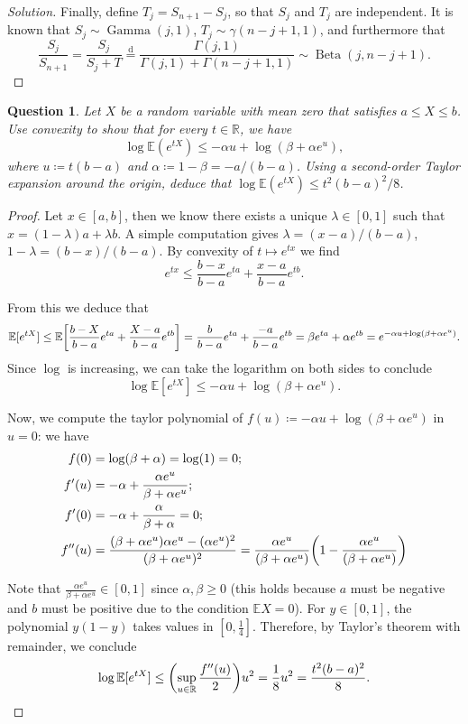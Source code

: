 \documentclass{article}
\theoremstyle{plain}
\newtheorem{question}{Question}
\theoremstyle{remark}
\newenvironment{solution}{\begin{proof}[Solution]\renewcommand\qedsymbol{}}{\end{proof}}
\newcommand{\Bb}{\mathbb}
\newcommand{\Rm}{\mathrm}
\newcommand{\RR}{\Bb R}
\newcommand{\EE}{\Bb E}
\newcommand\ceq\coloneqq %
\newcommand\deq{\overset{\Rm{d}}=}
\DeclareMathOperator\Beta{Beta}
\DeclareMathOperator\Gam{Gamma}
\begin{document}
\begin{solution}
Finally, define $T_j = S_{n+1} - S_j$, so that $S_j$ and $T_j$ are independent. It is known that $S_j \sim \Gam(j, 1)$, $T_j \sim \gamma(n - j + 1, 1)$, and furthermore that
\[
\frac{S_j}{S_{n+1}} = \frac{S_j}{S_j + T} \deq \frac{\Gamma(j, 1)}{\Gamma(j, 1) + \Gamma(n - j + 1, 1)} \sim \Beta(j, n - j + 1). 
\]
\end{solution}

\begin{question}
    Let $X$ be a random variable with mean zero that satisfies $a \leq X \leq b$. Use convexity to show that for every $t \in \RR$, we have
    \[
    \log \EE(e^{tX}) \leq - \alpha u + \log(\beta + \alpha e^u),
    \]
    where $u \ceq t(b-a)$ and $\alpha \ceq 1 - \beta = -a/(b-a)$. Using a second-order Taylor expansion around the origin, deduce that $\log \EE(e^{tX}) \leq t^2 (b-a)^2/8$. 
\end{question}

\begin{proof}
    Let $x \in [a, b]$, then we know there exists a unique $\lambda \in [0, 1]$ such that $x = (1-\lambda) a + \lambda b$. A simple computation gives $\lambda = (x-a)/(b-a)$, $1 - \lambda = (b-x)/(b-a)$. By convexity of $t \mapsto e^{tx}$ we find
    \[
    e^{tx} \leq \frac{b-x}{b-a} e^{t a} + \frac{x-a}{b-a} e^{t b}. 
    \]
    
    From this we deduce that 
    \[
    \EE[e^{tX}] \leq \EE\qty[\frac{b-X}{b-a} e^{t a} + \frac{X-a}{b-a} e^{t b}] = \frac{b}{b - a} e ^{ta} + \frac{-a}{b - a} e^{tb} = \beta e^{ta} + \alpha e^{tb} = e^{-\alpha u + \log(\beta + \alpha e^u)}. 
    \]
    Since $\log$ is increasing, we can take the logarithm on both sides to conclude
    \[
    \log \EE[e^{tX}] \leq -\alpha u + \log(\beta + \alpha e^u). 
    \]
    
    Now, we compute the taylor polynomial of $f(u) \ceq -\alpha u + \log(\beta + \alpha e^u)$ in $u = 0$: we have
    \begin{align*}
        f(0) &= \log(\beta + \alpha) = \log(1) = 0; \\
        f'(u) &= -\alpha + \frac{\alpha e^u}{\beta + \alpha e^u}; \\
        f'(0) &= -\alpha + \frac{\alpha}{\beta + \alpha} = 0; \\
        f''(u) &= \frac{(\beta + \alpha e^u)\alpha e^u - (\alpha e^u)^2}{(\beta + \alpha e^u)^2} = \frac{\alpha e^u}{(\beta + \alpha e^u)} \qty(1 - \frac{\alpha e^u}{(\beta + \alpha e^u)})
    \end{align*}

Note that $\frac{\alpha e^u}{\beta + \alpha e^u} \in [0, 1]$ since $\alpha, \beta \geq 0$ (this holds because $a$ must be negative and $b$ must be positive due to the condition $\EE X = 0$). For $y \in [0, 1]$, the polynomial $y(1-y)$ takes values in $[0, \frac14]$. Therefore, by Taylor's theorem with remainder, we conclude
\[
\log \EE[e^{tX}] \leq \qty(\sup_{u \in \RR} \frac{f''(u)}{2} )u^2 = \frac18 u^2 = \frac{t^2(b-a)^2}{8}. 
\]
\end{proof}
\end{document}
